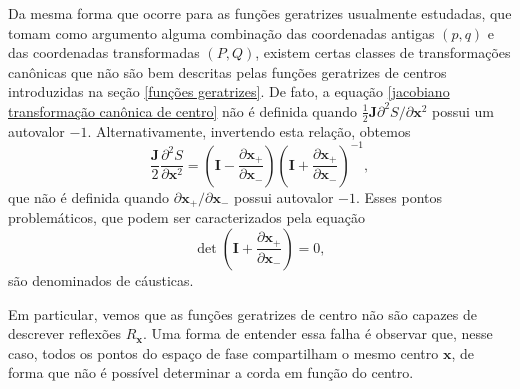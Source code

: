 \documentclass[
	12pt,
	oneside,			%
	a4paper,			%
	english,			%
	brazil				%
	]{abntex2}
\theoremstyle{definition}
\begin{document}
Da mesma forma que ocorre para as funções geratrizes usualmente estudadas, que tomam como argumento alguma combinação das coordenadas antigas $(p,q)$ e das coordenadas transformadas $(P,Q)$, existem certas classes de transformações canônicas que não são bem descritas pelas funções geratrizes de centros introduzidas na seção \ref{funções geratrizes}. De fato, a equação \eqref{jacobiano transformação canônica de centro} não é definida quando $\frac{1}{2}\mathbf{J} \partial^2 S/ \partial \mathbf{x}^2$ possui um autovalor $-1$. Alternativamente, invertendo esta relação, obtemos
\begin{equation}
    \frac{\mathbf{J}}{2} \frac{\partial^2 S}{\partial \mathbf{x}^2} = \left(\mathbf{I} - \frac{\partial \mathbf{x}_+}{\partial \mathbf{x}_-} \right) \left(\mathbf{I} + \frac{\partial \mathbf{x}_+}{\partial \mathbf{x}_-} \right)^{-1},
\end{equation}
que não é definida quando $\partial \mathbf{x}_+/\partial \mathbf{x}_-$ possui autovalor $-1$. Esses pontos problemáticos, que podem ser caracterizados pela equação
\begin{equation}
    \det \left(\mathbf{I} + \frac{\partial \mathbf{x}_+}{\partial \mathbf{x}_-} \right) = 0,
\end{equation}
são denominados de cáusticas.

Em particular, vemos que as funções geratrizes de centro não são capazes de descrever reflexões $R_{\mathbf{x}}$. Uma forma de entender essa falha é observar que, nesse caso, todos os pontos do espaço de fase compartilham o mesmo centro $\mathbf{x}$, de forma que não é possível determinar a corda em função do centro.
\end{document}
